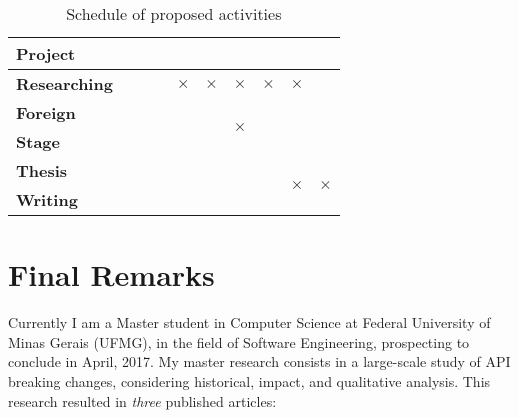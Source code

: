 \documentclass[11pt, a4paper]{article}
\begin{document}
\begin{table}[H]
{\begin{tabular}{|l|cc|ccccc|cc|}
			\textbf{Project}                                           &                      &                     &                           &                           &                           &                           &                   &                           &                           \\ \hline
			\textbf{Researching}                                          &                      &                     &                           & $\times$                  & $\times$                  & $\times$                  & $\times$          & $\times$                  &                           \\ \hline
			\textbf{Foreign}                                           & \multirow{2}{*}{}    & \multirow{2}{*}{}   & \multirow{2}{*}{}         & \multirow{2}{*}{}         & \multirow{2}{*}{}         & \multirow{2}{*}{$\times$} & \multirow{2}{*}{} & \multirow{2}{*}{}         & \multirow{2}{*}{}         \\
			\textbf{Stage}                                       &                      &                     &                           &                           &                           &                           &                   &                           &                           \\ \hline
			\textbf{Thesis}                                           & \multirow{2}{*}{}    & \multirow{2}{*}{}   & \multirow{2}{*}{}         & \multirow{2}{*}{}         & \multirow{2}{*}{}         & \multirow{2}{*}{}         & \multirow{2}{*}{} & \multirow{2}{*}{$\times$} & \multirow{2}{*}{$\times$} \\
			\textbf{Writing}                                          &                      &                     &                           &                           &                           &                           &                   &                           &                           \\ \hline
		\end{tabular}
		
	}
	
	\caption{Schedule of proposed activities}
	\label{tab:schedule}
\end{table}


\section{Final Remarks} 
\label{sec:final}

Currently I am a Master student in Computer Science at Federal University of Minas Gerais (UFMG), in the field of Software Engineering, prospecting to conclude in April, 2017.
My master research consists in a large-scale study of API breaking changes, considering historical, impact, and qualitative analysis.
This research resulted in \emph{three} published articles:
\end{document}
